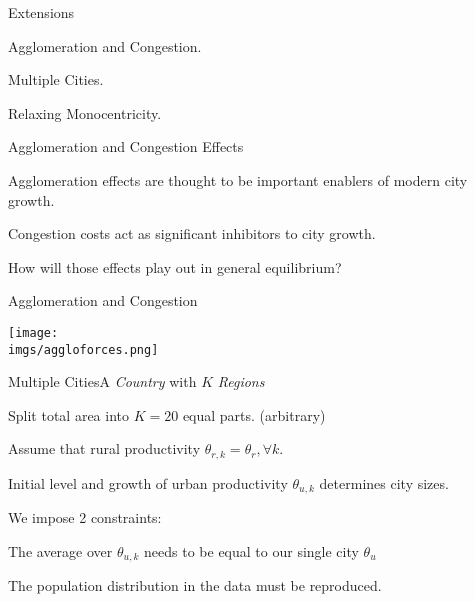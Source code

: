 \documentclass[aspectratio=169]{beamer}
\begin{document}
\begin{frame}{Extensions}

	\begin{mide}
		\item Agglomeration and Congestion.
		\item Multiple Cities.
		\item Relaxing Monocentricity.
	\end{mide}
\end{frame}

\begin{frame}{Agglomeration and Congestion Effects}
	
	\begin{midi}
		\item Agglomeration effects are thought to be important enablers of modern city growth.
		\item Congestion costs act as significant inhibitors to city growth.
		\item How will those effects play out in general equilibrium?
	\end{midi}
\end{frame}

\begin{frame}{Agglomeration and Congestion}

	\begin{adjustbox}{center}
		\texttt{[image: \\imgs/aggloforces.png]}
	\end{adjustbox}
	
\end{frame} 		


\begin{frame}{Multiple Cities}{A \emph{Country} with $K$ \emph{Regions}}
\begin{midi}
\item Split total area into $K=20$ equal parts. (arbitrary)
\item Assume that rural productivity $\theta_{r,k}=\theta_{r}, \forall k$.
\item Initial level and growth of urban productivity $\theta_{u,k}$ determines city 
sizes.
\end{midi}
\pause
\bigskip
We impose 2 constraints:
\medskip
\begin{mide}
	\item The average over $\theta_{u,k}$ needs to be equal to our single city $\theta_{u}$
	\item The population distribution in the data must be reproduced.
\end{mide}
\end{frame}
\end{document}
